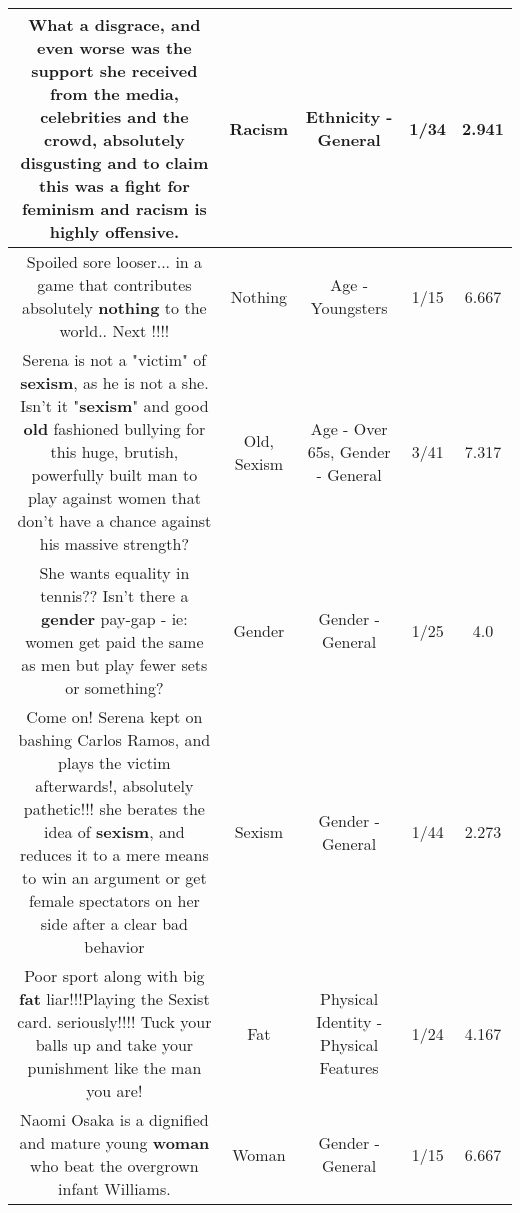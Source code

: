 \documentclass[11pt]{article}
\newlength\mylength
\begin{document}
\begin{center}
\begin{longtable}{|C{.65\mylength}|C{.30\mylength}|C{.12\mylength}|C{.12\mylength}|C{.12\mylength}|}
  \small What a disgrace, and even worse was the support she received from the media, celebrities and the crowd, absolutely disgusting and to claim this was a fight for feminism and \textbf{racism} is highly offensive.\normalsize   & Racism & Ethnicity - General & 1/34 & 2.941 \\  \hline
  \small Spoiled sore looser... in a game that contributes absolutely \textbf{nothing} to the world.. Next !!!!\normalsize   & Nothing & Age - Youngsters & 1/15 & 6.667 \\  \hline
  \small Serena is not a "victim" of \textbf{sexism}, as he is not a she. Isn't it "\textbf{sexism}" and good \textbf{old} fashioned bullying for this huge, brutish, powerfully built man to play against women that don't have a chance against his massive strength?\normalsize   & Old, Sexism & Age - Over 65s, Gender - General & 3/41 & 7.317 \\  \hline
  \small She wants equality in tennis?? Isn't there a \textbf{gender} pay-gap - ie: women get paid the same as men but play fewer sets or something?\normalsize   & Gender & Gender - General & 1/25 & 4.0 \\  \hline
  \small Come on! Serena kept on bashing Carlos Ramos, and plays the victim afterwards!, absolutely pathetic!!! she berates the idea of \textbf{sexism}, and reduces it to a mere means to win an argument or get female spectators on her side after a clear bad behavior\normalsize   & Sexism & Gender - General & 1/44 & 2.273 \\  \hline
  \small Poor sport along with big \textbf{fat} liar!!!Playing the Sexist  card. seriously!!!! Tuck your balls up and take your punishment like the man you are!\normalsize   & Fat & Physical Identity - Physical Features & 1/24 & 4.167 \\  \hline
  \small Naomi Osaka is a dignified and mature young \textbf{woman} who beat the overgrown infant Williams.\normalsize   & Woman & Gender - General & 1/15 & 6.667 \\  \hline

\end{longtable}
\end{center}
\end{document}
